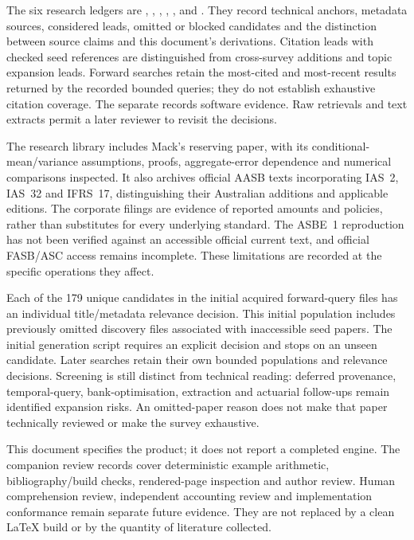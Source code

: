 The six research ledgers are ,
, ,
, , and
. They record technical anchors, metadata sources,
considered leads, omitted or blocked candidates and the distinction between
source claims and this document's derivations. Citation leads with checked
seed references are distinguished from cross-survey additions and topic
expansion leads. Forward searches retain the most-cited and most-recent
results returned by the recorded bounded queries; they do not establish
exhaustive citation coverage. The separate 
records software evidence. Raw retrievals and text extracts permit a later
reviewer to revisit the decisions.

The research library includes Mack's reserving paper, with its conditional-mean/variance
assumptions, proofs, aggregate-error dependence and numerical comparisons
inspected. It also archives official AASB texts incorporating IAS~2, IAS~32
and IFRS~17, distinguishing their Australian additions and applicable editions.
The corporate filings are evidence of reported amounts and policies, rather
than substitutes for every underlying standard. The ASBE~1 reproduction has
not been verified against an accessible official current text, and official
FASB/ASC access remains incomplete. These limitations are recorded at the
specific operations they affect.

Each of the 179 unique candidates in the initial acquired forward-query
files has an individual title/metadata relevance decision. This initial
population includes previously omitted discovery files associated with
inaccessible seed papers. The initial generation script requires an explicit
decision and stops on an unseen candidate. Later searches retain their own
bounded populations and relevance decisions. Screening is still distinct from technical reading: deferred
provenance, temporal-query, bank-optimisation, extraction and actuarial
follow-ups remain identified expansion risks. An omitted-paper reason does
not make that paper technically reviewed or make the survey exhaustive.

This document specifies the product; it does not report a completed engine.
The companion review records cover deterministic example arithmetic,
bibliography/build checks, rendered-page inspection and author review. Human
comprehension review, independent accounting review and implementation
conformance remain separate future evidence. They are not replaced by a clean
LaTeX build or by the quantity of literature collected.
